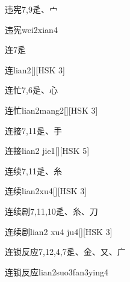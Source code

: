\begin{entry}{违宪}{7,9}{⾡、⼧}
  \begin{phonetics}{违宪}{wei2xian4}
  \end{phonetics}
\end{entry}

\begin{entry}{连}{7}{⾡}
  \begin{phonetics}{连}{lian2}[][HSK 3]
  \end{phonetics}
\end{entry}

\begin{entry}{连忙}{7,6}{⾡、⼼}
  \begin{phonetics}{连忙}{lian2mang2}[][HSK 3]
  \end{phonetics}
\end{entry}

\begin{entry}{连接}{7,11}{⾡、⼿}
  \begin{phonetics}{连接}{lian2 jie1}[][HSK 5]
  \end{phonetics}
\end{entry}

\begin{entry}{连续}{7,11}{⾡、⽷}
  \begin{phonetics}{连续}{lian2xu4}[][HSK 3]
  \end{phonetics}
\end{entry}

\begin{entry}{连续剧}{7,11,10}{⾡、⽷、⼑}
  \begin{phonetics}{连续剧}{lian2 xu4 ju4}[][HSK 3]
  \end{phonetics}
\end{entry}

\begin{entry}{连锁反应}{7,12,4,7}{⾡、⾦、⼜、⼴}
  \begin{phonetics}{连锁反应}{lian2suo3fan3ying4}
  \end{phonetics}
\end{entry}

